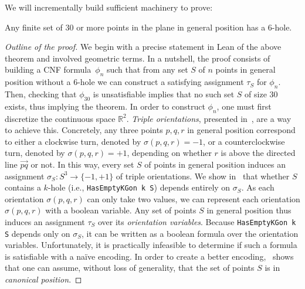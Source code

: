 We will incrementally build sufficient machinery to prove:

\begin{theorem*}
Any finite set of $30$ or more points in the plane in general position has a $6$-hole.
\end{theorem*}

\begin{proof}[Outline of the proof]
We begin  with a precise statement in Lean of the above theorem and involved geometric terms.
In a nutshell, the proof consists of building a CNF formula~$\phi_n$ such that 
from any set $S$ of $n$ points in general position without a $6$-hole we can construct a satisfying assignment $\tau_S$ for $\phi_n$.
Then, checking that $\phi_{30}$ is unsatisfiable implies that no such set $S$ of size $30$ exists, thus implying the theorem. 
% 
In order to construct $\phi_n$, one must first discretize the continuous space $\mathbb{R}^2$. \emph{Triple orientations}, presented in~, are a way to achieve this. Concretely, any three points $p,q,r$ in general position correspond to either a clockwise turn, denoted by $\sigma(p, q, r) = -1$, or a counterclockwise turn, denoted by $\sigma(p, q, r) = +1$, depending on whether $r$ is above the directed line $\overrightarrow{pq}$ or not. 
In this way, every set $S$ of points in general position induces an assignment $\sigma_S: S^3 \to \{-1,+1\}$
of triple orientations.
We show in~ that whether $S$ contains a $k$-hole (i.e., \lstinline|HasEmptyKGon k S|) depends entirely on $\sigma_S$. 
As each orientation $\sigma(p, q, r)$ can only take two values, we can represent each orientation $\sigma(p,q,r)$ with a boolean variable. Any set of points $S$ in general position thus induces an assignment $\tau_S$ over its \emph{orientation variables}. 
Because \lstinline|HasEmptyKGon k S| depends only on $\sigma_S$, it can be written as a boolean formula over the orientation variables.
% 
Unfortunately, it is practically infeasible to determine if such a formula is satisfiable with a naïve encoding.
In order to create a better encoding,~ shows that one can assume, without loss of generality, that the set of points $S$ is in \emph{canonical position}.

\end{proof}
